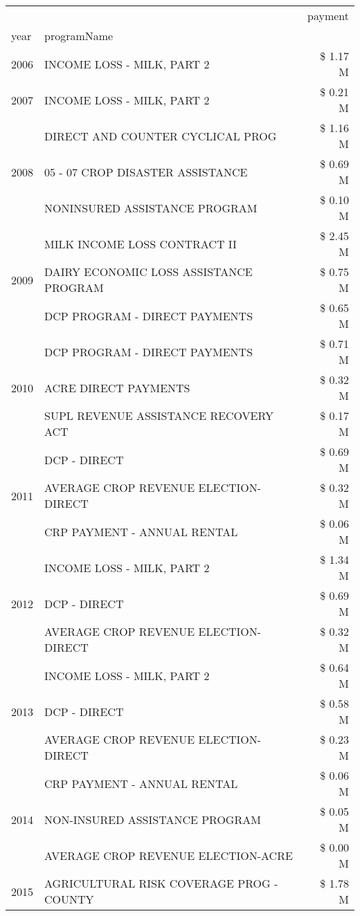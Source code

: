 \begin{tabular}{llr}
\toprule
 &  & payment \\
year & programName &  \\
\midrule
2006 & INCOME LOSS - MILK, PART 2 & \$ 1.17 M \\
\cline{1-3}
2007 & INCOME LOSS - MILK, PART 2 & \$ 0.21 M \\
\cline{1-3}
\multirow[t]{3}{*}{2008} & DIRECT AND COUNTER CYCLICAL PROG & \$ 1.16 M \\
 & 05 - 07 CROP DISASTER ASSISTANCE & \$ 0.69 M \\
 & NONINSURED ASSISTANCE PROGRAM & \$ 0.10 M \\
\cline{1-3}
\multirow[t]{3}{*}{2009} & MILK INCOME LOSS CONTRACT II & \$ 2.45 M \\
 & DAIRY ECONOMIC LOSS ASSISTANCE PROGRAM & \$ 0.75 M \\
 & DCP PROGRAM - DIRECT PAYMENTS & \$ 0.65 M \\
\cline{1-3}
\multirow[t]{3}{*}{2010} & DCP PROGRAM - DIRECT PAYMENTS & \$ 0.71 M \\
 & ACRE DIRECT PAYMENTS & \$ 0.32 M \\
 & SUPL REVENUE ASSISTANCE RECOVERY ACT & \$ 0.17 M \\
\cline{1-3}
\multirow[t]{3}{*}{2011} & DCP - DIRECT & \$ 0.69 M \\
 & AVERAGE CROP REVENUE ELECTION-DIRECT & \$ 0.32 M \\
 & CRP PAYMENT - ANNUAL RENTAL & \$ 0.06 M \\
\cline{1-3}
\multirow[t]{3}{*}{2012} & INCOME LOSS - MILK, PART 2 & \$ 1.34 M \\
 & DCP - DIRECT & \$ 0.69 M \\
 & AVERAGE CROP REVENUE ELECTION-DIRECT & \$ 0.32 M \\
\cline{1-3}
\multirow[t]{3}{*}{2013} & INCOME LOSS - MILK, PART 2 & \$ 0.64 M \\
 & DCP - DIRECT & \$ 0.58 M \\
 & AVERAGE CROP REVENUE ELECTION-DIRECT & \$ 0.23 M \\
\cline{1-3}
\multirow[t]{3}{*}{2014} & CRP PAYMENT - ANNUAL RENTAL & \$ 0.06 M \\
 & NON-INSURED ASSISTANCE PROGRAM & \$ 0.05 M \\
 & AVERAGE CROP REVENUE ELECTION-ACRE & \$ 0.00 M \\
\cline{1-3}
\multirow[t]{3}{*}{2015} & AGRICULTURAL RISK COVERAGE PROG - COUNTY & \$ 1.78 M \\

\end{tabular}
